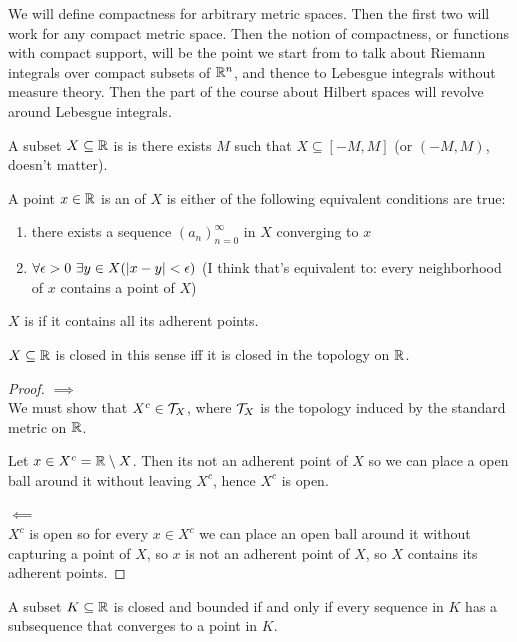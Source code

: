 We will define compactness for arbitrary metric spaces. Then the first two will work for any
compact metric space. Then the notion of compactness, or functions with compact support, will be
the point we start from to talk about Riemann integrals over compact subsets of $\mathbb{R}^n$, and thence
to Lebesgue integrals without measure theory. Then the part of the course about Hilbert spaces will
revolve around Lebesgue integrals.

\begin{definition}
  A subset $X \subseteq \mathbb{R}$ is  is there exists $M$ such that $X \subseteq [-M, M]$ (or $(-M, M)$,
  doesn't matter).

  A point $x \in \mathbb{R}$ is an  of $X$ is either of the following equivalent conditions are true:
  \begin{enumerate}
  \item there exists a sequence $(a_n)_{n=0}^\infty$ in $X$ converging to $x$
  \item $\forall \epsilon > 0 ~ \exists y \in X(|x - y| < \epsilon)$ (I think that's equivalent to: every neighborhood
    of $x$ contains a point of $X$)
  \end{enumerate}
  $X$ is  if it contains all its adherent points.
\end{definition}

\begin{lemma}
  $X \subseteq \mathbb{R}$ is closed in this sense iff it is closed in the topology on $\mathbb{R}$.
\end{lemma}

\begin{proof}
  $\implies$\\
  We must show that $X^c \in \mathcal T_X$, where $\mathcal T_X$ is the topology induced by the standard metric on $\mathbb{R}$.

  Let $x \in X^c = \mathbb{R} \setminus X$. Then its not an adherent point of $X$ so we can place a open
  ball around it without leaving $X^c$, hence $X^c$ is open.

  $\impliedby$\\
  $X^c$ is open so for every $x \in X^c$ we can place an open ball around it without capturing a point of $X$,
  so $x$ is not an adherent point of $X$, so $X$ contains its adherent points.
\end{proof}

\begin{theorem}
  A subset $K \subseteq \mathbb{R}$ is closed and bounded if and only if every sequence in $K$ has a
  subsequence that converges to a point in $K$.
\end{theorem}

